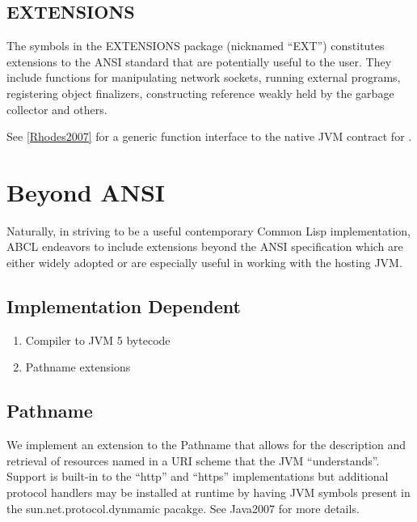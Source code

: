 \documentclass[10pt]{book}
\begin{document}


\section{EXTENSIONS}

The symbols in the EXTENSIONS package (nicknamed ``EXT'') constitutes
extensions to the ANSI standard that are potentially useful to the
user.  They include functions for manipulating network sockets,
running external programs, registering object finalizers, constructing
reference weakly held by the garbage collector and others.

See \ref{Rhodes2007} for a generic function interface to the native
JVM contract for .



\chapter{Beyond ANSI}

Naturally, in striving to be a useful contemporary Common Lisp
implementation, ABCL endeavors to include extensions beyond the ANSI
specification which are either widely adopted or are especially useful
in working with the hosting JVM.

\section{Implementation Dependent}
\begin{enumerate}
  \item Compiler to JVM 5 bytecode
  \item Pathname extensions
\end{enumerate}

\section{Pathname}

We implement an extension to the Pathname that allows for the
description and retrieval of resources named in a URI scheme that the
JVM ``understands''.  Support is built-in to the ``http'' and
``https'' implementations but additional protocol handlers may be
installed at runtime by having JVM symbols present in the
sun.net.protocol.dynmamic pacakge. See Java2007 \cite{Java2007} for more
details.
\end{document}
